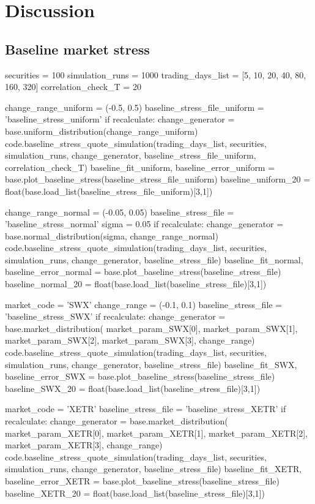 \documentclass[11pt,twoside,a4paper]{article}
\numberwithin{equation}{section}
\numberwithin{figure}{section}
\numberwithin{table}{section}
\begin{document}
\section{Discussion}
\subsection{Baseline market stress}
\begin{pycode}
securities = 100
simulation_runs = 1000
trading_days_list = [5, 10, 20, 40, 80, 160, 320]
correlation_check_T = 20

change_range_uniform = (-0.5, 0.5)
baseline_stress_file_uniform = 'baseline_stress_uniform'
if recalculate:
	change_generator = base.uniform_distribution(change_range_uniform)
	code.baseline_stress_quote_simulation(trading_days_list, securities, simulation_runs, change_generator, baseline_stress_file_uniform, correlation_check_T)
baseline_fit_uniform,  baseline_error_uniform = base.plot_baseline_stress(baseline_stress_file_uniform)
baseline_uniform_20 = float(base.load_list(baseline_stress_file_uniform)[3,1])

change_range_normal = (-0.05, 0.05)
baseline_stress_file = 'baseline_stress_normal'
sigma = 0.05
if recalculate:
	change_generator = base.normal_distribution(sigma, change_range_normal)
	code.baseline_stress_quote_simulation(trading_days_list, securities, simulation_runs, change_generator, baseline_stress_file)
baseline_fit_normal,  baseline_error_normal = base.plot_baseline_stress(baseline_stress_file)
baseline_normal_20 = float(base.load_list(baseline_stress_file)[3,1])

market_code = 'SWX'
change_range = (-0.1, 0.1)
baseline_stress_file = 'baseline_stress_SWX'
if recalculate:
	change_generator = base.market_distribution(
        market_param_SWX[0], market_param_SWX[1], market_param_SWX[2], market_param_SWX[3], change_range)
	code.baseline_stress_quote_simulation(trading_days_list, securities, simulation_runs, change_generator, baseline_stress_file)
baseline_fit_SWX,  baseline_error_SWX = base.plot_baseline_stress(baseline_stress_file)
baseline_SWX_20 = float(base.load_list(baseline_stress_file)[3,1])

market_code = 'XETR'
baseline_stress_file = 'baseline_stress_XETR'
if recalculate:
	change_generator = base.market_distribution(
        market_param_XETR[0], market_param_XETR[1], market_param_XETR[2], market_param_XETR[3], change_range)
	code.baseline_stress_quote_simulation(trading_days_list, securities, simulation_runs, change_generator, baseline_stress_file)
baseline_fit_XETR,  baseline_error_XETR = base.plot_baseline_stress(baseline_stress_file)
baseline_XETR_20 = float(base.load_list(baseline_stress_file)[3,1])


\end{pycode}
\end{document}
